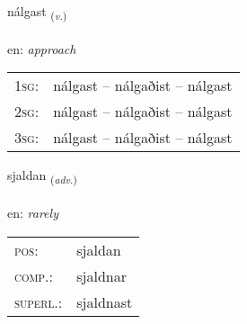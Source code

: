 \documentclass[frontgrid, backgrid]{flacards}\usepackage[]{graphicx}\usepackage[]{color}
\begin{document}
\renewcommand{\flhead}{\vskip5pt \fboxsep=0pt {\small\bfseries\footnotesize Sagnorð | Verb}}
\renewcommand{\fcfoot}{\vskip5pt \fboxsep=0pt \hspace{2pt}{\small\bfseries\footnotesize 2K}}

\renewcommand{\blhead}{\vskip5pt {\small\bfseries\footnotesize Sagnorð | Verb }}
\renewcommand{\bcfoot}{\vskip5pt \hspace{2pt}{\small\bfseries\footnotesize 2K}}


{nálgast \small{\textsubscript{(\textit{v.})}} \\[1ex] %
\textphonetic{[naulkast]} \\
en: \emph{approach} \\  [2ex]
\renewcommand*{\arraystretch}{0.8}
\begin{tabular}{p{1cm}l}
\textsc{1sg}: & nálgast -- nálgaðist -- nálgast \\ 
\textsc{2sg}: & nálgast -- nálgaðist -- nálgast \\ 
\textsc{3sg}: & nálgast -- nálgaðist -- nálgast \\ 
\end{tabular}
}

\renewcommand{\flhead}{\vskip5pt \fboxsep=0pt {\small\bfseries\footnotesize Atviksorð | Adverb}}
\renewcommand{\fcfoot}{\vskip5pt \fboxsep=0pt \hspace{2pt}{\small\bfseries\footnotesize 2K}}

\renewcommand{\blhead}{\vskip5pt {\small\bfseries\footnotesize Atviksorð | Adverb }}
\renewcommand{\bcfoot}{\vskip5pt \hspace{2pt}{\small\bfseries\footnotesize 2K}}


{sjaldan \small{\textsubscript{(\textit{adv.})}} \\[1ex] %
\textphonetic{[sjaltan]} \\
en: \emph{rarely} \\  [2ex]
\renewcommand*{\arraystretch}{0.8}
\begin{tabular}{ll}
\textsc{pos}: & sjaldan \\ 
\textsc{comp.}: & sjaldnar \\ 
\textsc{superl.}: & sjaldnast \\
\end{tabular}
}
\end{document}
